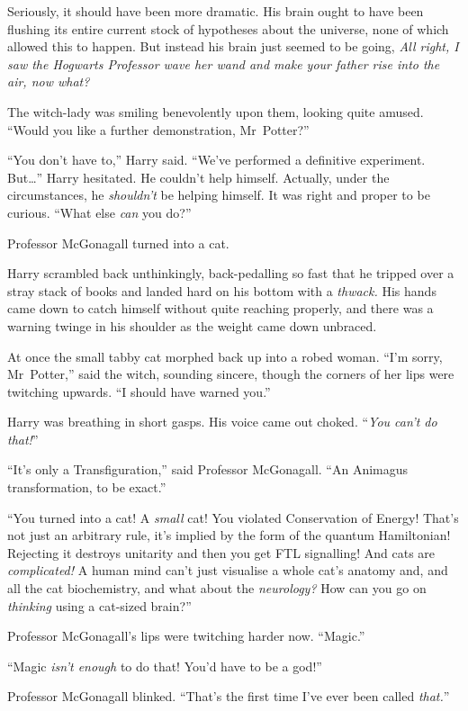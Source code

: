Seriously, it should have been more dramatic. His brain ought to have been flushing its entire current stock of hypotheses about the universe, none of which allowed this to happen. But instead his brain just seemed to be going, \emph{All right, I saw the Hogwarts Professor wave her wand and make your father rise into the air, now what?}

The witch-lady was smiling benevolently upon them, looking quite amused. “Would you like a further demonstration, Mr~Potter?”

“You don’t have to,” Harry said. “We’ve performed a definitive experiment. But…” Harry hesitated. He couldn’t help himself. Actually, under the circumstances, he \emph{shouldn’t} be helping himself. It was right and proper to be curious. “What else \emph{can} you do?”

Professor McGonagall turned into a cat.

Harry scrambled back unthinkingly, back-pedalling so fast that he tripped over a stray stack of books and landed hard on his bottom with a \emph{thwack.} His hands came down to catch himself without quite reaching properly, and there was a warning twinge in his shoulder as the weight came down unbraced.

At once the small tabby cat morphed back up into a robed woman. “I’m sorry, Mr~Potter,” said the witch, sounding sincere, though the corners of her lips were twitching upwards. “I should have warned you.”

Harry was breathing in short gasps. His voice came out choked. “\emph{You can’t \emph{do} that!}”

“It’s only a Transfiguration,” said Professor McGonagall. “An Animagus transformation, to be exact.”

“You turned into a cat! A \emph{small} cat! You violated Conservation of Energy! That’s not just an arbitrary rule, it’s implied by the form of the quantum Hamiltonian! Rejecting it destroys unitarity and then you get FTL signalling! And cats are \emph{complicated!} A human mind can’t just visualise a whole cat’s anatomy and, and all the cat biochemistry, and what about the \emph{neurology?} How can you go on \emph{thinking} using a cat-sized brain?”

Professor McGonagall’s lips were twitching harder now. “Magic.”

“Magic \emph{isn’t enough} to do that! You’d have to be a god!”

Professor McGonagall blinked. “That’s the first time I’ve ever been called \emph{that.}”

